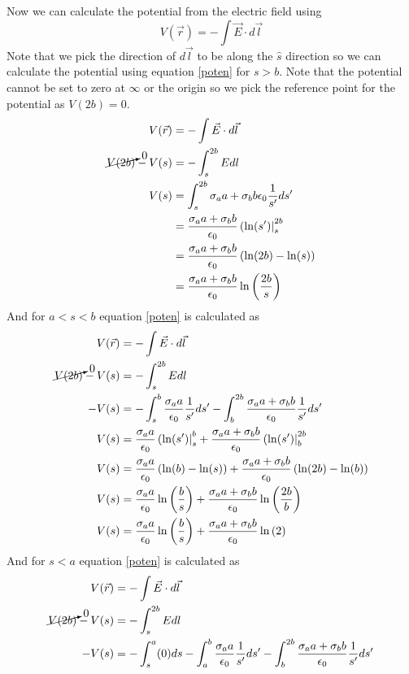 \documentclass[11pt]{article}
\numberwithin{equation}{section}
\begin{document}
Now we can calculate the potential from the electric field using 
\begin{equation}
V(\vec{r}) = -\int\vec{E}\cdot d\vec{l}
\label{poten}
\end{equation}
Note that we pick the direction of $d\vec{l}$ to be along the $\hat{s}$ direction so we can calculate the potential using equation \ref{poten} for $s>b$. Note that the potential cannot be set to zero at $\infty$ or the origin so we pick the reference point for the potential as $V(2b) = 0$.
\begin{align*}
V(\vec{r}) &= -\int\vec{E}\cdot d\vec{l}\\
\cancelto{0}{V(2b)} - V(s) &= -\int_s^{2b}Edl\\
V(s) &= \int_s^{2b}{\sigma_aa+\sigma_bb}{\epsilon_0}\dfrac{1}{s'}ds'\\
&= \dfrac{\sigma_aa+\sigma_bb}{\epsilon_0}\left(\ln(s')\right|_s^{2b}\\
&= \dfrac{\sigma_aa+\sigma_bb}{\epsilon_0}\left(\ln(2b)-\ln(s)\right)\\
&= \dfrac{\sigma_aa+\sigma_bb}{\epsilon_0}\ln\left(\frac{2b}{s}\right)
\end{align*}
And for $a<s<b$ equation \ref{poten} is calculated as
\begin{align*}
V(\vec{r}) &= -\int\vec{E}\cdot d\vec{l}\\
\cancelto{0}{V(2b)} - V(s) &= -\int_s^{2b}Edl\\
- V(s) &= - \int_s^{b}\dfrac{\sigma_aa}{\epsilon_0}\dfrac{1}{s'}ds' - \int_b^{2b}\dfrac{\sigma_aa+\sigma_bb}{\epsilon_0}\dfrac{1}{s'}ds'\\
V(s) &= \dfrac{\sigma_aa}{\epsilon_0}\left(\ln(s')\right|_s^{b} + \dfrac{\sigma_aa+\sigma_bb}{\epsilon_0}\left(\ln(s')\right|_b^{2b}\\
V(s) &= \dfrac{\sigma_aa}{\epsilon_0}\left(\ln(b)-\ln(s)\right) + \dfrac{\sigma_aa+\sigma_bb}{\epsilon_0}\left(\ln(2b)-\ln(b)\right)\\
V(s) &= \dfrac{\sigma_aa}{\epsilon_0}\ln\left(\frac{b}{s}\right) + \dfrac{\sigma_aa+\sigma_bb}{\epsilon_0}\ln\left(\frac{2b}{b}\right)\\
V(s) &= \dfrac{\sigma_aa}{\epsilon_0}\ln\left(\frac{b}{s}\right) + \dfrac{\sigma_aa+\sigma_bb}{\epsilon_0}\ln\left(2\right)
\end{align*}
And for $s<a$ equation \ref{poten} is calculated as
\begin{align*}
V(\vec{r}) &= -\int\vec{E}\cdot d\vec{l}\\
\cancelto{0}{V(2b)} - V(s) &= -\int_s^{2b}Edl\\
- V(s) &= -\int_s^a(0)ds - \int_a^{b}\dfrac{\sigma_aa}{\epsilon_0}\dfrac{1}{s'}ds' - \int_b^{2b}\dfrac{\sigma_aa+\sigma_bb}{\epsilon_0}\dfrac{1}{s'}ds'
\end{align*}
\end{document}
